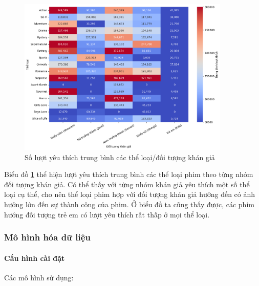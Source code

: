     \begin{figure}[htp]
        \centering
        \includegraphics[width=0.90\textwidth]{images/Table_MAL_genre_demo_fav.png}
        \caption{Số lượt yêu thích trung bình các thể loại/đối tượng khán giả}
        \label{fig:Table_MAL_genre_demo_fav}
    \end{figure}

    \FloatBarrier

    Biểu đồ \ref{fig:Table_MAL_genre_demo_fav} thể hiện lượt yêu thích trung bình các thể loại phim theo từng nhóm đối tượng khán giả. Có thể thấy với từng nhóm khán giả yêu thích một số thể loại cụ thể, cho nên thể loại phim hợp với đối tượng khán giả hướng đến có ảnh hưởng lớn đến sự thành công của phim. Ở biểu đồ ta cũng thấy được, các phim hướng đối tượng trẻ em có lượt yêu thích rất thấp ở mọi thể loại.


\subsubsection{Mô hình hóa dữ liệu}
    \paragraph{Cấu hình cài đặt} 
    \leavevmode

    Các mô hình sử dụng:

